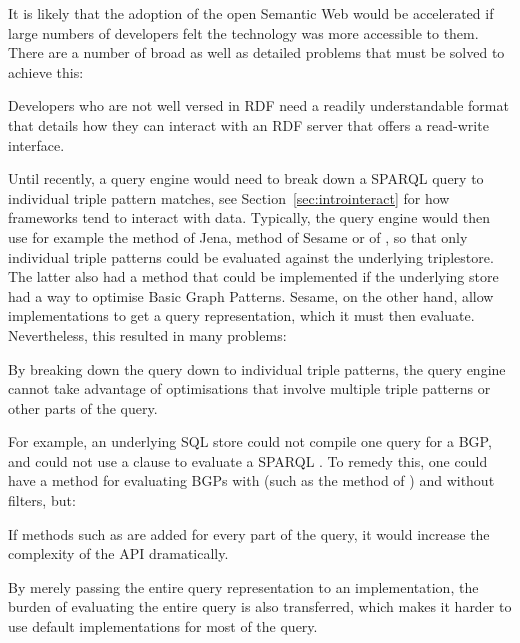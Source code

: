 It is likely that the adoption of the open Semantic Web would be
accelerated if large numbers of developers felt the technology was
more accessible to them. There are a number of broad as well as
detailed problems that must be solved to achieve this:


\begin{problem}\label{prob:lapis}
Developers who are not well versed in RDF need a readily
understandable format that details how they can interact with an RDF
server that offers a read-write interface.
\end{problem}


Until recently, a query engine would need to break down a SPARQL query
to individual triple pattern matches, see
Section~\ref{sec:introinteract} for how frameworks tend to interact
with data. Typically, the query engine would then use for example
the  method of Jena,  method
of Sesame or  of , so that only
individual triple patterns could be evaluated against the underlying
triplestore.  The latter also had a  method that
could be implemented if the underlying store had a way to optimise
Basic Graph Patterns. Sesame, on the other hand, allow implementations
to get a query representation, which it must then evaluate.
Nevertheless, this resulted in many problems:

\begin{problem}\label{prob:breakdown}
By breaking down the query down to individual triple patterns, the
query engine cannot take advantage of optimisations that involve
multiple triple patterns or other parts of the query.
\end{problem}

For example, an underlying SQL store could not compile one query for a
BGP, and could not use a  clause to evaluate a SPARQL
. To remedy this, one could have a method for
evaluating BGPs with (such as the   method of
) and without filters, but:

\begin{problem}\label{prob:complexapi}
If methods such as  are added for every part of the
query, it would increase the complexity of the API dramatically.
\end{problem}

\begin{problem}\label{prob:dontjustpass}
By merely passing the entire query representation to an
implementation, the burden of evaluating the entire query is also
transferred, which makes it harder to use default implementations for
most of the query.
\end{problem}

